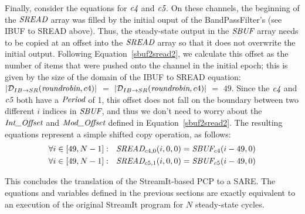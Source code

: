 Finally, consider the equations for $\mbox{\it c4}$ and $\mbox{\it c5}$.  On these
channels, the beginning of the $\mbox{\it SREAD}$ array was filled by the
initial ouput of the BandPassFilter's (see IBUF to SREAD above).
Thus, the steady-state output in the $\mbox{\it SBUF}$ array needs to be
copied at an offset into the $\mbox{\it SREAD}$ array so that it does not
overwrite the initial output.  Following Equation~\ref{sbuf2sread2},
we calculate this offset as the number of items that were pushed onto
the channel in the initial epoch; this is given by the size of the
domain of the IBUF to SREAD equation: $|{\cal D}_{IB \rightarrow
SR}(\mbox{\it roundrobin}, c4)|$ $=$ $|{\cal D}_{IB \rightarrow
SR}(\mbox{\it roundrobin}, c4)|$ $=$ $49$.  Since the $\mbox{\it c4}$ and
$\mbox{\it c5}$ both have a $\mbox{\it Period}$ of 1, this offset does not fall on
the boundary between two different $i$ indices in $\mbox{\it SBUF}$, and
thus we don't need to worry about the $\mbox{\it Int\_Offset}$ and
$\mbox{\it Mod\_Offset}$ defined in Equation~\ref{sbuf2sread2}.  The
resulting equations represent a simple shifted copy operation, as
follows:
\begin{align*}
\forall i \in [49,N-1]:~~\mbox{\it SREAD}_{{c4}, 0}(i,0,0) = \mbox{\it SBUF}_{c4}(i-49,0) \\
\forall i \in [49,N-1]:~~\mbox{\it SREAD}_{{c5}, 1}(i,0,0) = \mbox{\it SBUF}_{c5}(i-49,0)
\end{align*}

This concludes the translation of the StreamIt-based PCP to a SARE.
The equations and variables defined in the previous sections are
exactly equivalent to an execution of the original StreamIt program
for $N$ steady-state cycles.
